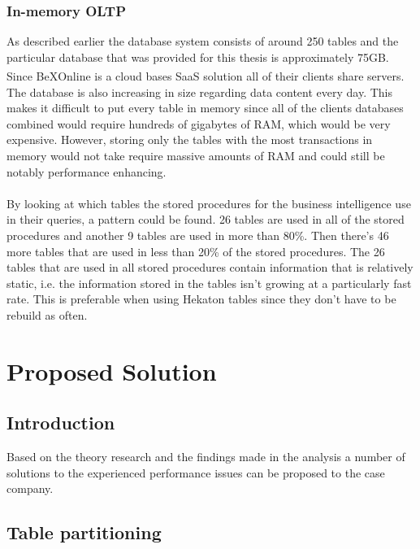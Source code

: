 \documentclass{cslthse-msc}
\newcommand{\bex}{BeX\textsuperscript{\textregistered}}
\begin{document}
\subsection{In-memory OLTP}
As described earlier the database system consists of around 250 tables and the particular database that was provided for this thesis is approximately 75GB. Since \bex Online is a cloud bases SaaS solution all of their clients share servers. The database is also increasing in size regarding data content every day. This makes it difficult to put every table in memory since all of the clients databases combined would require hundreds of gigabytes of RAM, which would be very expensive. However, storing only the tables with the most transactions in memory would not take require massive amounts of RAM and could still be notably performance enhancing.
\\\\
By looking at which tables the stored procedures for the business intelligence use in their queries, a pattern could be found. 26 tables are used in all of the stored procedures and another 9 tables are used in more than 80\%. Then there's 46 more tables that are used in less than 20\% of the stored procedures. The 26 tables that are used in all stored procedures contain information that is relatively static, i.e. the information stored in the tables isn't growing at a particularly fast rate. This is preferable when using Hekaton tables since they don't have to be rebuild as often.

\chapter{Proposed Solution}\label{sec:proposedsoluton}
\section{Introduction}
Based on the theory research and the findings made in the analysis a number of solutions to the experienced performance issues can be proposed to the case company.

\section{Table partitioning}
\end{document}
